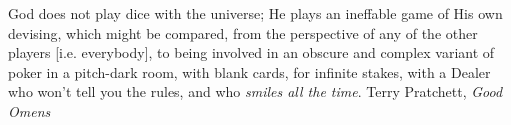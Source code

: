 
\begin{declaration}
  
\end{declaration}

\begin{abstract}
  
\end{abstract}

\begin{acknowledgements}
  
\end{acknowledgements}

\begin{preface}
  
\end{preface}

\tableofcontents

\listoffigures
\listoftables

\frontquote%
{God does not play dice with the universe; He plays an ineffable game of His own
devising, which might be compared, from the perspective of any of the other
players [i.e. everybody], to being involved in an obscure and complex variant of
poker in a pitch-dark room, with blank cards, for infinite stakes, with a Dealer
who won't tell you the rules, and who \emph{smiles all the time}.}
{Terry Pratchett, \emph{Good Omens}}
